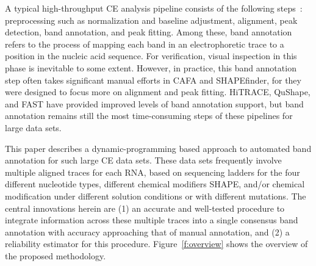 A typical high-throughput CE analysis pipeline consists of the following steps~\citep{Yoon2011,Karabiber2013,Kladwang2014}: preprocessing such as normalization and baseline adjustment, alignment, peak detection, band annotation, and peak fitting. Among these, band annotation refers to the process of mapping each band in an electrophoretic trace to a position in the nucleic acid sequence. For verification, visual inspection in this phase is inevitable to some extent. However, in practice, this band annotation step often takes significant manual efforts in CAFA and SHAPEfinder, for they were designed to focus more on alignment and peak fitting. HiTRACE, QuShape, and FAST have provided improved levels of band annotation support, but band annotation remains still the most time-consuming steps of these pipelines for large data sets.

This paper describes a dynamic-programming based approach to automated band annotation for such large CE data sets. These data sets frequently involve multiple aligned traces for each RNA, based on sequencing ladders for the four different nucleotide types, different chemical modifiers SHAPE, and/or chemical modification under different solution conditions or with different mutations. The central innovations herein are (1) an accurate and well-tested procedure to integrate information across these multiple traces into a single consensus band annotation with accuracy approaching that of manual annotation, and (2) a reliability estimator for this procedure. Figure~\ref{f:overview} shows the overview of the proposed methodology.


